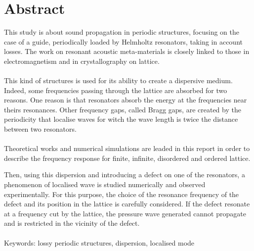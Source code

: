 \section*{Abstract}

This study is about sound propagation in periodic structures, focusing on the case of a guide, periodically loaded by Helmholtz resonators, taking in account losses. The work on resonant acoustic meta-materials is closely linked to those in electromagnetism and in crystallography on lattice.\\~\\ %

This kind of structures is used for its ability to create a dispersive medium. Indeed, some frequencies passing through the lattice are absorbed for two reasons. One reason is that resonators absorb the energy at the frequencies near theirs resonances. Other frequency gaps, called Bragg gaps, are created by the periodicity that localise waves for witch the wave length is twice the distance between two resonators.\\~\\

Theoretical works and numerical simulations are leaded in this report in order to describe the frequency response for finite, infinite, disordered and ordered lattice. 

Then, using this dispersion and introducing a defect on one of the resonators, a phenomenon of localised wave is studied numerically and observed experimentally. For this purpose, the choice of the resonance frequency of the defect and its position in the lattice is carefully considered. If the defect resonate at a frequency cut by the lattice, the pressure wave generated cannot propagate and is restricted in the vicinity of the defect.\\~\\ 


Keywords: lossy periodic structures, dispersion, localised mode 




